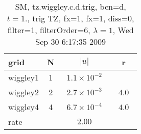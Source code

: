 \begin{table}[hbt]\tableFont %
\begin{center}
\begin{tabular}{|l|c|c|c|} \hline 
grid  & N &  $\vert u \vert$   & r \\ \hline 
            wiggley1 &     1 & ~$1.1\times10^{ -2}$~ &            \\ \hline
            wiggley2 &     2 & ~$2.7\times10^{ -3}$~ & ~$  4.0$~  \\ \hline
            wiggley4 &     4 & ~$6.7\times10^{ -4}$~ & ~$  4.0$~  \\ \hline
    rate             &       &       $2.00$         &        \\ \hline
\end{tabular}
\caption{SM, tz.wiggley.c.d.trig, bcn=d, $t=1.$, trig TZ, fx=1, fx=1, diss=0, filter=1, filterOrder=6, $\lambda=1$, Wed Sep 30  6:17:35 2009}\label{table:tz.wiggley.c.d.trig}
\end{center}
\end{table}

